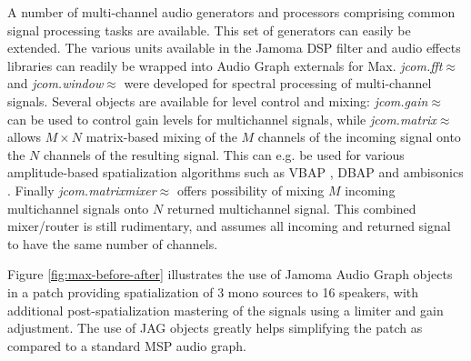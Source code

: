 \documentclass[twoside,a4paper]{article}
\begin{document}
A number of multi-channel audio generators and processors comprising common signal processing tasks are available. %
This set of generators can easily be extended.
The various units available in the Jamoma DSP filter and audio effects libraries can readily be wrapped into Audio Graph externals for Max.
\emph{jcom.fft$\approx$} and \emph{jcom.window$\approx$} were developed for spectral processing of multi-channel signals.
Several objects are available for level control and mixing: 
\emph{jcom.gain$\approx$} can be used to control gain levels for multichannel signals, while \emph{jcom.matrix$\approx$} allows $M \times N$ matrix-based mixing of the $M$ channels of the incoming signal onto the $N$ channels of the resulting signal. 
This can e.g. be used for various amplitude-based spatialization algorithms such as VBAP \cite{Pulkki:1997vbap}, DBAP \cite{lossius:2009} and ambisonics \cite{Schacher:2006ambi_max}.
Finally \emph{jcom.matrixmixer$\approx$} offers possibility of mixing $M$ incoming multichannel signals onto $N$ returned multichannel signal.
This combined mixer/router is still rudimentary, and assumes all incoming and returned signal to have the same number of channels.

Figure \ref{fig:max-before-after} illustrates the use of Jamoma Audio Graph objects in a patch providing spatialization of 3 mono sources to 16 speakers, with additional post-spatialization mastering of the signals using a limiter and gain adjustment.
The use of JAG objects greatly helps simplifying the patch as compared to a standard MSP audio graph. 


\end{document}
